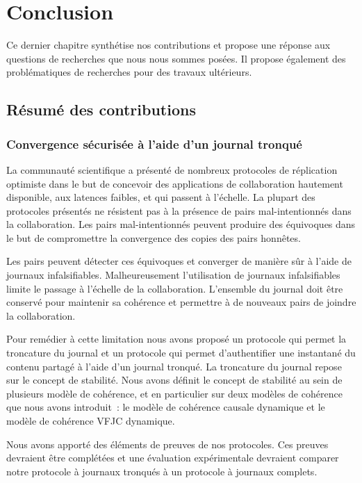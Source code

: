 
\chapter{Conclusion}\label{ch:conclusion}

\minitoc{}
\bigskip

Ce dernier chapitre synthétise nos contributions et propose une réponse aux questions de recherches que nous nous sommes posées.
Il propose également des problématiques de recherches pour des travaux ultérieurs.

\clearpage
\section{Résumé des contributions}

\subsection{Convergence sécurisée à l'aide d'un journal tronqué}

La communauté scientifique a présenté de nombreux protocoles de réplication optimiste dans le but de concevoir des applications de collaboration hautement disponible, aux latences faibles, et qui passent à l'échelle.
La plupart des protocoles présentés ne résistent pas à la présence de pairs mal-intentionnés dans la collaboration.
Les pairs mal-intentionnés peuvent produire des équivoques dans le but de compromettre la convergence des copies des pairs honnêtes.

Les pairs peuvent détecter ces équivoques et converger de manière sûr à l'aide de journaux infalsifiables.
Malheureusement l'utilisation de journaux infalsifiables limite le passage à l'échelle de la collaboration.
L'ensemble du journal doit être conservé pour maintenir sa cohérence et permettre à de nouveaux pairs de joindre la collaboration.

Pour remédier à cette limitation nous avons proposé un protocole qui permet la troncature du journal et un protocole qui permet d'authentifier une instantané du contenu partagé à l'aide d'un journal tronqué.
La troncature du journal repose sur le concept de stabilité.
Nous avons définit le concept de stabilité au sein de plusieurs modèle de cohérence, et en particulier sur deux modèles de cohérence que nous avons introduit~: le modèle de cohérence causale dynamique et le modèle de cohérence \acl{VFJC} dynamique.

Nous avons apporté des éléments de preuves de nos protocoles.
Ces preuves devraient être complétées et une évaluation expérimentale devraient comparer notre protocole à journaux tronqués à un protocole à journaux complets.


